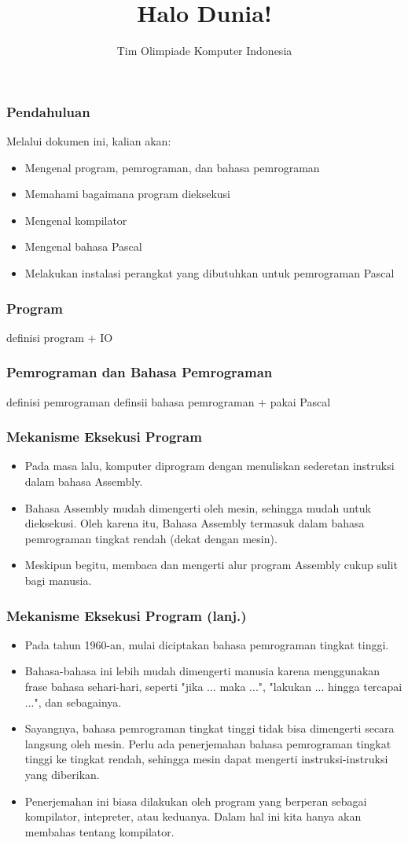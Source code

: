 \documentclass{beamer}
\title{Halo Dunia!}
\author{Tim Olimpiade Komputer Indonesia}
\begin{document}
\begin{frame}
\titlepage
\end{frame}

\begin{frame}
\frametitle{Pendahuluan}
Melalui dokumen ini, kalian akan:
\begin{itemize}
	\item Mengenal program, pemrograman, dan bahasa pemrograman
	\item Memahami bagaimana program dieksekusi
	\item Mengenal kompilator
	\item Mengenal bahasa Pascal
	\item Melakukan instalasi perangkat yang dibutuhkan untuk pemrograman Pascal
\end{itemize}
\end{frame}

\begin{frame}
\frametitle{Program}
definisi program + IO
\end{frame}

\begin{frame}
\frametitle{Pemrograman dan Bahasa Pemrograman}
definisi pemrograman
definsii bahasa pemrograman + pakai Pascal
\end{frame}

\begin{frame}
\frametitle{Mekanisme Eksekusi Program}
\begin{itemize}
	\item Pada masa lalu, komputer diprogram dengan menuliskan sederetan instruksi dalam bahasa Assembly.
	\item Bahasa Assembly mudah dimengerti oleh mesin, sehingga mudah untuk dieksekusi. Oleh karena itu, Bahasa Assembly termasuk dalam bahasa pemrograman tingkat rendah (dekat dengan mesin).
	\item Meskipun begitu, membaca dan mengerti alur program Assembly cukup sulit bagi manusia.
\end{itemize}
\end{frame}

\begin{frame}
\frametitle{Mekanisme Eksekusi Program (lanj.)}
\begin{itemize}
	\item Pada tahun 1960-an, mulai diciptakan bahasa pemrograman tingkat tinggi.
	\item Bahasa-bahasa ini lebih mudah dimengerti manusia karena menggunakan frase bahasa sehari-hari, seperti "jika ... maka ...", "lakukan ... hingga tercapai ...", dan sebagainya.
	\item Sayangnya, bahasa pemrograman tingkat tinggi tidak bisa dimengerti secara langsung oleh mesin. Perlu ada penerjemahan bahasa pemrograman tingkat tinggi ke tingkat rendah, sehingga mesin dapat mengerti instruksi-instruksi yang diberikan.
	\item Penerjemahan ini biasa dilakukan oleh program yang berperan sebagai kompilator, intepreter, atau keduanya. Dalam hal ini kita hanya akan membahas tentang kompilator.
\end{itemize}
\end{frame}
\end{document}
